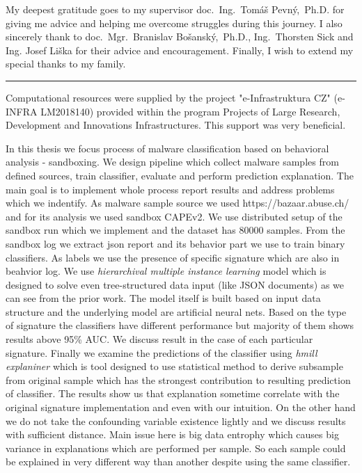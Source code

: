 \documentclass[11pt,twoside,a4paper]{book}
\begin{document}
	\translate

	{
		
		\newpage
	}

	\coverpagestarts

	\acknowledgements
	\noindent
	My deepest gratitude goes to my supervisor doc.~Ing.~Tomáš Pevný,~Ph.D. for giving me advice and helping me overcome struggles during this journey. I also sincerely thank to doc.~Mgr.~Branislav Bošanský,~Ph.D., Ing.~Thorsten Sick and Ing. Josef Liška for their advice and encouragement. Finally, I wish to extend my special thanks to my family.

	\noindent\rule{\textwidth}{0.4pt}

	\noindent Computational resources were supplied by the project "e-Infrastruktura CZ" (e-INFRA LM2018140) provided within the program Projects of Large Research, Development and Innovations Infrastructures. This support was very beneficial.



	\abstractpage
	In this thesis we focus process of malware classification based on behavioral analysis - sandboxing. We design pipeline which collect malware samples from defined sources, train classifier, evaluate and perform prediction explanation. The main goal is to implement whole process report results and address problems which we indentify. As malware sample source we used https://bazaar.abuse.ch/ and for its analysis we used sandbox CAPEv2. We use distributed setup of the sandbox run which we implement and the dataset has $80000$ samples. From the sandbox log we extract json report and its behavior part we use to train binary classifiers. As labels we use the presence of specific signature which are also in beahvior log. We use \emph{hierarchival multiple instance learning} model which is designed to solve even tree-structured data input (like JSON documents) as we can see from the prior work. The model itself is built based on input data structure and the underlying model are artificial neural nets. Based on the type of signature the classifiers have different performance but majority of them shows results above 95\% AUC. We discuss result in the case of each particular signature. Finally we examine the predictions of the classifier using \emph{hmill explaniner} which is tool designed to use statistical method to derive subsample from original sample which has the strongest contribution to resulting prediction of classifier. The results show us that explanation sometime correlate with the original signature implementation and even with our intuition. On the other hand we do not take the confounding variable existence lightly and we discuss results with sufficient distance. Main issue here is big data entrophy which causes big variance in explanations which are performed per sample. So each sample could be explained in very different way than another despite using the same classifier. \
	
\end{document}
